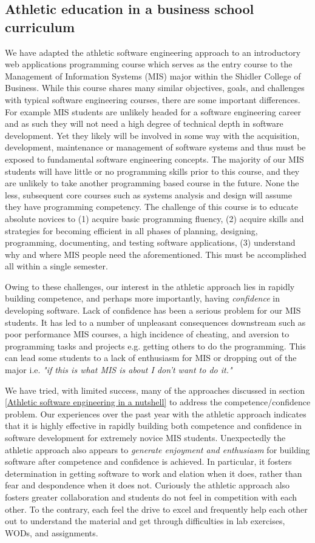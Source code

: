 \subsection{Athletic education in a business school curriculum}
We have adapted the athletic software engineering approach to an introductory web applications programming course which serves as the entry course to the Management of Information Systems (MIS) major within the Shidler College of Business. While this course shares many similar objectives, goals, and challenges with typical software engineering courses, there are some important differences. For example MIS students are unlikely headed for a software engineering career and as such they will not need a high degree of technical depth in software development. Yet they likely will be involved in some way with the acquisition, development, maintenance or management of software systems and thus must be exposed to fundamental software engineering concepts. The majority of our MIS students will have little or no programming skills prior to this course, and they are unlikely to take another programming based course in the future. None the less, subsequent core courses such as systems analysis and design will assume they have programming competency. The challenge of this course is to educate absolute novices to (1) acquire basic programming fluency, (2) acquire skills and strategies for becoming efficient in all phases of planning, designing, programming, documenting, and testing software applications, (3) understand why and where MIS people need the aforementioned. This must be accomplished all within a single semester. 

Owing to these challenges, our interest in the athletic approach lies in rapidly building competence, and perhaps more importantly, having {\em confidence} in developing software. Lack of confidence has been a serious problem for our MIS students. It has led to a number of unpleasant consequences downstream such as poor performance MIS courses, a high incidence of cheating, and aversion to programming tasks and projects e.g. getting others to do the programming. This can lead some students to a lack of enthusiasm for MIS or dropping out of the major i.e. {\em "if this is what MIS is about I don't want to do it."} 

We have tried, with limited success, many of the approaches discussed in section \ref{Athletic software engineering in a nutshell} to address the competence/confidence  problem. Our experiences over the past year with the athletic approach indicates that it is highly effective in rapidly building both competence and confidence in software development for extremely novice MIS students. Unexpectedly the athletic approach also appears to {\em generate enjoyment and enthusiasm} for building software after competence and confidence is achieved. In particular, it fosters determination in getting software to work and elation when it does, rather than fear and despondence when it does not. Curiously the athletic approach also fosters greater collaboration and students do not feel in competition with each other. To the contrary, each feel the drive to excel and frequently help each other out to understand the material and get through difficulties in lab exercises, WODs, and assignments.

